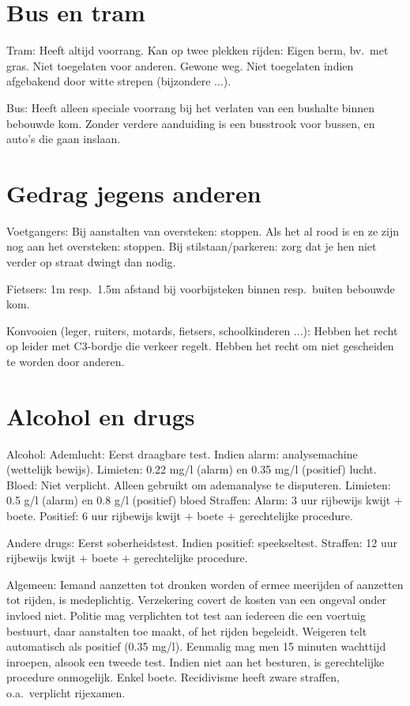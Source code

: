 \section{Bus en tram}
\begin{outline}
\1 Tram:
	\2 Heeft altijd voorrang.
	\2 Kan op twee plekken rijden:
		\3 Eigen berm, bv.\ met gras. Niet toegelaten voor anderen.
		\3 Gewone weg. Niet toegelaten indien afgebakend door witte strepen (bijzondere ...).
	
\1 Bus:
	\2 Heeft alleen speciale voorrang bij het verlaten van een bushalte binnen bebouwde kom.
	\2 Zonder verdere aanduiding is een busstrook voor bussen, en auto's die gaan inslaan.
\end{outline}

\section{Gedrag jegens anderen}
\begin{outline}
\1 Voetgangers: 
	\2 Bij aanstalten van oversteken: stoppen.
	\2 Als het al rood is en ze zijn nog aan het oversteken: stoppen.
	\2 Bij stilstaan/parkeren: zorg dat je hen niet verder op straat dwingt dan nodig.
	
\1 Fietsers:
	\2 1m resp.\ 1.5m afstand bij voorbijsteken binnen resp.\ buiten bebouwde kom.

\1 Konvooien (leger, ruiters, motards, fietsers, schoolkinderen ...):
	\2 Hebben het recht op leider met C3-bordje die verkeer regelt.
	\2 Hebben het recht om niet gescheiden te worden door anderen.
\end{outline}

\section{Alcohol en drugs}
\begin{outline}
\1 Alcohol:
	\2 Ademlucht:
		\3 Eerst draagbare test. Indien alarm: analysemachine (wettelijk bewijs).
		\3 Limieten: 0.22 mg/l (alarm) en 0.35 mg/l (positief) lucht.
	\2 Bloed:
		\3 Niet verplicht. Alleen gebruikt om ademanalyse te disputeren.
		\3 Limieten: 0.5 g/l (alarm) en 0.8 g/l (positief) bloed
	\2 Straffen:
		\3 Alarm: 3 uur rijbewijs kwijt $+$ boete.
		\3 Positief: 6 uur rijbewijs kwijt $+$ boete $+$ gerechtelijke procedure.
		
\1 Andere drugs:
	\2 Eerst soberheidstest. Indien positief: speekseltest.
	\2 Straffen: 12 uur rijbewijs kwijt $+$ boete $+$ gerechtelijke procedure.
	
\1 Algemeen:
	\2 Iemand aanzetten tot dronken worden of ermee meerijden of aanzetten tot rijden, is medeplichtig.
	\2 Verzekering covert de kosten van een ongeval onder invloed niet.
	\2 Politie mag verplichten tot test aan iedereen die een voertuig bestuurt, daar aanstalten toe maakt, of het rijden begeleidt.
		\3 Weigeren telt automatisch als positief (0.35 mg/l).
		\3 Eenmalig mag men 15 minuten wachttijd inroepen, alsook een tweede test.
		\3 Indien niet aan het besturen, is gerechtelijke procedure onmogelijk. Enkel boete.
	\2 Recidivisme heeft zware straffen, o.a.\ verplicht rijexamen.
\end{outline}

